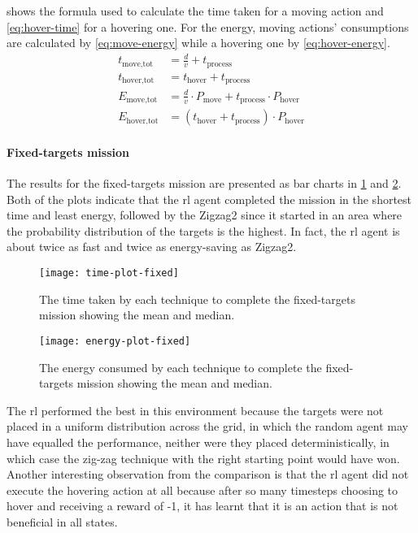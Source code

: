 \documentclass[../main.tex]{subfiles}
\begin{document}
 shows the formula used to
calculate the time taken for a moving action and
\cref{eq:hover-time} for a hovering one.
For the energy, moving actions' consumptions are calculated
by \cref{eq:move-energy} while a hovering one by
\cref{eq:hover-energy}.
\begin{align}
t_{\text{move,tot}} &= 
\frac{d}{v} + t_{\text{process}}
	\label{eq:move-time}
        \\
t_{\text{hover,tot}} &= 
t_{\text{hover}} + t_{\text{process}}
	\label{eq:hover-time}
        \\
E_{\text{move,tot}} &= 
\frac{d}{v} \cdot P_{\text{move}} 
+ t_{\text{process}} \cdot P_{\text{hover}}
	\label{eq:move-energy}
        \\
E_{\text{hover,tot}} &= 
\left( t_{\text{hover}} + t_{\text{process}} \right) \cdot P_{\text{hover}}
	\label{eq:hover-energy}
\end{align}

\paragraph{Fixed-targets mission}

The results for the fixed-targets mission are presented as bar charts in 
\cref{fig:time-plot-fixed} and \cref{fig:energy-plot-fixed}.
Both of the plots indicate that the \gls{rl} agent completed
the mission in the shortest time and least energy, followed
by the Zigzag2 since it started in an area 
where the probability
distribution of the targets is the highest.
In fact, the \gls{rl} agent is about twice as fast and twice
as energy-saving as Zigzag2.

\begin{figure}[btp]
	\centering
	\texttt{[image: time-plot-fixed]}
	\caption{The time taken by each technique
            to complete the fixed-targets mission showing the mean and
    median.}
        \label{fig:time-plot-fixed}
\end{figure}

\begin{figure}[tbp]
	\centering
	\texttt{[image: energy-plot-fixed]}
	\caption{The energy consumed by each technique
            to complete the fixed-targets mission showing the mean and
    median.}
        \label{fig:energy-plot-fixed}
\end{figure}

The \gls{rl} performed the best in this environment because
the targets were not placed in a uniform distribution
across the grid,
in which the random agent may have equalled the performance,
neither were they placed deterministically, 
in which case the zig-zag technique with the
right starting point would have won.
Another interesting observation from the comparison is that
the \gls{rl} agent did not execute the hovering action at all
because after so many timesteps choosing to hover and
receiving a reward of -1, it has learnt that it is an
action that is not beneficial in all states.
\end{document}
